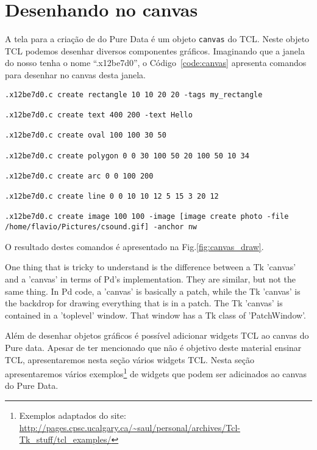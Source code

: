 \section{Desenhando no canvas}

A tela para a criação de \patches do Pure Data é um objeto \texttt{canvas} do
TCL.
Neste objeto TCL podemos desenhar diversos componentes gráficos.
Imaginando que a janela do nosso \patch tenha o nome ``.x12be7d0'', o
Código~\ref{code:canvas} apresenta comandos para desenhar no canvas desta
janela.

\begin{lstlisting}[caption={Desenhando componentes gráficos no canvas},label={code:canvas}]
.x12be7d0.c create rectangle 10 10 20 20 -tags my_rectangle

.x12be7d0.c create text 400 200 -text Hello

.x12be7d0.c create oval 100 100 30 50

.x12be7d0.c create polygon 0 0 30 100 50 20 100 50 10 34

.x12be7d0.c create arc 0 0 100 200

.x12be7d0.c create line 0 0 10 10 12 5 15 3 20 12

.x12be7d0.c create image 100 100 -image [image create photo -file /home/flavio/Pictures/csound.gif] -anchor nw
\end{lstlisting}

O resultado destes comandos é apresentado na Fig.\ref{fig:canvas_draw}.



One thing that is tricky to understand is the difference between a Tk
'canvas' and a 'canvas' in terms of Pd's implementation.  They are similar,
but not the same thing.  In Pd code, a 'canvas' is basically a patch, while
the Tk 'canvas' is the backdrop for drawing everything that is in a patch.
The Tk 'canvas' is contained in a 'toplevel' window. That window has a Tk
class of 'PatchWindow'.


Além de desenhar objetos gráficos é possível adicionar widgets TCL ao canvas
do Pure data.
Apesar de ter mencionado que não é objetivo deste material ensinar TCL,
apresentaremos nesta seção vários widgets TCL.
Nesta seção apresentaremos vários exemplos\footnote{Exemplos adaptados do site: \url{http://pages.cpsc.ucalgary.ca/~saul/personal/archives/Tcl-Tk_stuff/tcl_examples/}}
de widgets que podem ser adicinados ao canvas do Pure Data.

